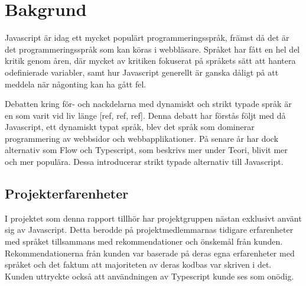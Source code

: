 \section{Bakgrund}
\label{sec:alexander-background}

Javascript är idag ett mycket populärt programmeringsspråk, främst då det är det programmeringsspråk som kan köras i webbläsare. Språket har fått en hel del kritik genom åren, där mycket av kritiken fokuserat på språkets sätt att hantera odefinierade variabler, samt hur Javascript generellt är ganska dåligt på att meddela när någonting kan ha gått fel.

Debatten kring för- och nackdelarna med dynamiskt och strikt typade språk är en som varit vid liv länge [ref, ref, ref]. Denna debatt har förstås följt med då Javascript, ett dynamiskt typat språk, blev det språk som dominerar programmering av webbsidor och webbapplikationer. På senare år har dock alternativ som Flow och Typescript, som beskrivs mer under Teori, blivit mer och mer populära. Dessa introducerar strikt typade alternativ till Javascript.

\subsection{Projekterfarenheter}
I projektet som denna rapport tillhör har projektgruppen nästan exklusivt använt sig av Javascript. Detta berodde på projektmedlemmarnas tidigare erfarenheter med språket tillsammans med rekommendationer och önskemål från kunden. Rekommendationerna från kunden var baserade på deras egna erfarenheter med språket och det faktum att majoriteten av deras kodbas var skriven i det. Kunden uttryckte också att användningen av Typescript kunde ses som onödig.